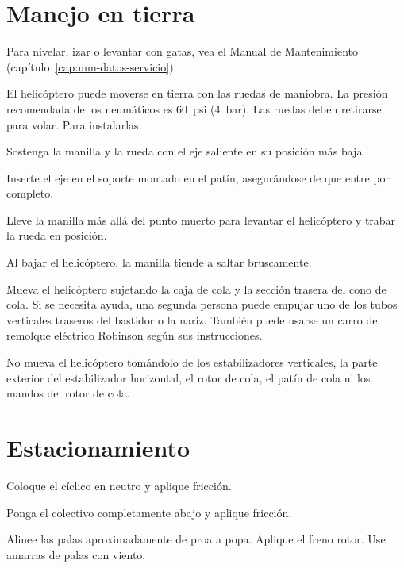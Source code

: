 \section{Manejo en tierra}

Para nivelar, izar o levantar con gatas, vea el Manual de Mantenimiento (capítulo~\ref{cap:mm-datos-servicio}).

El helicóptero puede moverse en tierra con las ruedas de maniobra. La presión recomendada de los neumáticos es 60~psi (4~bar). Las ruedas deben retirarse para volar. Para instalarlas:

\begin{pasos}
\item Sostenga la manilla y la rueda con el eje saliente en su posición más baja.
\item Inserte el eje en el soporte montado en el patín, asegurándose de que entre por completo.
\item Lleve la manilla más allá del punto muerto para levantar el helicóptero y trabar la rueda en posición.
\end{pasos}

\begin{precaucion}
Al bajar el helicóptero, la manilla tiende a saltar bruscamente.
\end{precaucion}

Mueva el helicóptero sujetando la caja de cola y la sección trasera del cono de cola. Si se necesita ayuda, una segunda persona puede empujar uno de los tubos verticales traseros del bastidor o la nariz. También puede usarse un carro de remolque eléctrico Robinson según sus instrucciones.

\begin{precaucion}
No mueva el helicóptero tomándolo de los estabilizadores verticales, la parte exterior del estabilizador horizontal, el rotor de cola, el patín de cola ni los mandos del rotor de cola.
\end{precaucion}

\section{Estacionamiento}

\begin{pasos}
\item Coloque el cíclico en neutro y aplique fricción.
\item Ponga el colectivo completamente abajo y aplique fricción.
\item Alinee las palas aproximadamente de proa a popa. Aplique el freno rotor. Use amarras de palas con viento.
\end{pasos}

